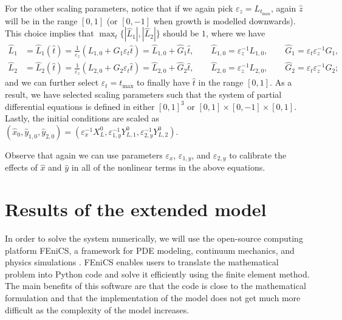 \documentclass[11pt]{article}
\numberwithin{equation}{section}
\begin{document}
For the other scaling parameters, notice that if we again pick \( \varepsilon_z = L_{t_{\max}}\), again \(\hat z \) will be in the range \( [0,1]\) (or \([0,-1]\) when growth is modelled downwards). 
This choice implies that \( \max_t\{|\hat{L}_1|,|\hat{L}_2|\}\) should be \(1\), where we have
\begin{align}
    \hat{L}_1 &= \hat{L}_1(\hat t) = \frac{1}{\varepsilon_z} ( L_{1,0} + G_1 \varepsilon_t \hat t )
    = \hat{L}_{1,0} + \hat{G}_1 \hat t,
    \qquad 
    \hat{L}_{1,0} = \varepsilon^{-1}_z L_{1,0},
    \qquad
    \hat{G}_1 = \varepsilon_t \varepsilon_z^{-1} G_1,
    \\
    \hat{L}_2 &= \hat{L}_2(\hat t) = \frac{1}{\varepsilon_z} ( L_{2,0} + G_2 \varepsilon_t \hat t )
    = \hat{L}_{2,0} + \hat{G}_2 \hat t,
    \qquad 
    \hat{L}_{2,0} = \varepsilon^{-1}_z L_{2,0},
    \qquad
    \hat{G}_2 = \varepsilon_t \varepsilon_z^{-1} G_2;
\end{align}
and we can further select \( \varepsilon_t = t_{\max}\) to finally have \( \hat t\) in the range \( [0,1]\). As a result, we have selected scaling parameters such that the system of partial differential equations is defined in either \( [0,1]^3\) or \([0,1]\times [0,-1] \times [0,1]\).
%
Lastly, the initial conditions are scaled as \( (\hat{x}_0,\hat{y}_{1,0},\hat{y}_{2,0} ) = (\varepsilon_x^{-1} X^0_L, \varepsilon_{1,y}^{-1} Y^0_{L,1}, \varepsilon_{2,y}^{-1} Y^0_{L,2}) \). 


Observe that again we can use parameters \(\varepsilon_x\), \(\varepsilon_{1,y}\), and \(\varepsilon_{2,y}\) to calibrate the effects of \( \hat{x}\) and \(\hat{y}\) in all of the nonlinear terms in the above equations.


\section{Results of the extended model}
\label{sec:Results_Extension}


In order to solve the system numerically, we will use the open-source computing platform FEniCS, a framework for PDE modeling, continuum mechanics, and physics simulations \cite{fenics}. FEniCS enables users to translate the mathematical problem into Python code and solve it efficiently using the finite element method. The main benefits of this software are that the code is close to the mathematical formulation and that the implementation of the model does not get much more difficult as the complexity of the model increases.
\end{document}
